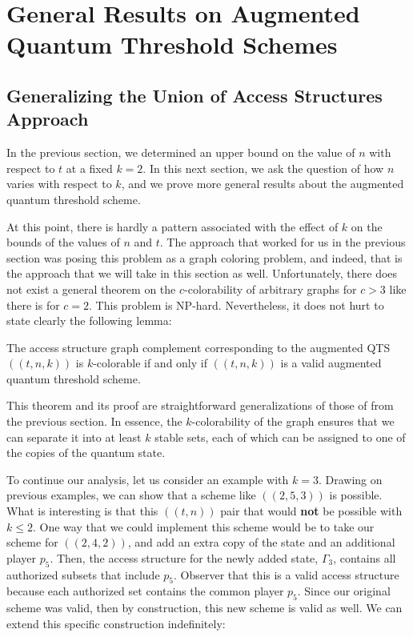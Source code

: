 \chapter{General Results on Augmented Quantum Threshold Schemes}

\section{Generalizing the Union of Access Structures Approach}

In the previous section, we determined an upper bound on the value of $n$ with respect to $t$ at a fixed $k=2$. In this next section, we ask the question of how $n$ varies with respect to $k$, and we prove more general results about the augmented quantum threshold scheme. 

At this point, there is hardly a pattern associated with the effect of $k$ on the bounds of the values of $n$ and $t$. The approach that worked for us in the previous section was posing this problem as a graph coloring problem, and indeed, that is the approach that we will take in this section as well. Unfortunately, there does not exist a general theorem on the $c$-colorability of arbitrary graphs for $c > 3$ like there is for $c=2$. This problem is NP-hard. Nevertheless, it does not hurt to state clearly the following lemma:

\begin{lemma}
    \label{lem:k-color-access}
    The access structure graph complement corresponding to the augmented QTS $((t,n,k))$ is $k$-colorable if and only if $((t,n,k))$ is a valid augmented quantum threshold scheme.
\end{lemma}

This theorem and its proof are straightforward generalizations of those of  from the previous section. In essence, the $k$-colorability of the graph ensures that we can separate it into at least $k$ stable sets, each of which can be assigned to one of the copies of the quantum state.

To continue our analysis, let us consider an example with $k=3$. Drawing on previous examples, we can show that a scheme like $((2,5,3))$ is possible. What is interesting is that this $((t,n))$ pair that would \textbf{not} be possible with $k \leq 2$. One way that we could implement this scheme would be to take our scheme for $((2,4,2))$, and add an extra copy of the state and an additional player $p_5$. Then, the access structure for the newly added state, $\Gamma_3$, contains all authorized subsets that include $p_5$. Observer that this is a valid access structure because each authorized set contains the common player $p_5$. Since our original scheme was valid, then by construction, this new scheme is valid as well. We can extend this specific construction indefinitely:

